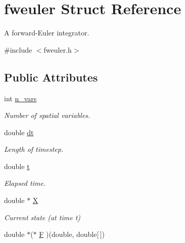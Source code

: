 \hypertarget{structfweuler}{\section{fweuler Struct Reference}
\label{structfweuler}
}


A forward-\/\-Euler integrator.  




{\ttfamily \#include $<$fweuler.\-h$>$}

\subsection*{Public Attributes}
\begin{DoxyCompactItemize}
\item 
\hypertarget{structfweuler_a79f8c4cfdb9adfa253c8b4c037c237f8}{int \hyperlink{structfweuler_a79f8c4cfdb9adfa253c8b4c037c237f8}{n\-\_\-vars}}\label{structfweuler_a79f8c4cfdb9adfa253c8b4c037c237f8}

\begin{DoxyCompactList}\small\item\em Number of spatial variables. \end{DoxyCompactList}\item 
\hypertarget{structfweuler_aaaa8f46ce07dde8c2f1d3fbb0097d166}{double \hyperlink{structfweuler_aaaa8f46ce07dde8c2f1d3fbb0097d166}{dt}}\label{structfweuler_aaaa8f46ce07dde8c2f1d3fbb0097d166}

\begin{DoxyCompactList}\small\item\em Length of timestep. \end{DoxyCompactList}\item 
\hypertarget{structfweuler_ab00dd0addf40e99c6abe9e65f5e140d5}{double \hyperlink{structfweuler_ab00dd0addf40e99c6abe9e65f5e140d5}{t}}\label{structfweuler_ab00dd0addf40e99c6abe9e65f5e140d5}

\begin{DoxyCompactList}\small\item\em Elapsed time. \end{DoxyCompactList}\item 
\hypertarget{structfweuler_ae6a7a8f3084e4a42a4c7da4c4a36dcc0}{double $\ast$ \hyperlink{structfweuler_ae6a7a8f3084e4a42a4c7da4c4a36dcc0}{X}}\label{structfweuler_ae6a7a8f3084e4a42a4c7da4c4a36dcc0}

\begin{DoxyCompactList}\small\item\em Current state (at time t) \end{DoxyCompactList}\item 
\hypertarget{structfweuler_a2010a1b8fcd7024ea0ec02e432df11cb}{double $\ast$($\ast$ \hyperlink{structfweuler_a2010a1b8fcd7024ea0ec02e432df11cb}{F} )(double, double\mbox{[}$\,$\mbox{]})}\label{structfweuler_a2010a1b8fcd7024ea0ec02e432df11cb}


\end{DoxyCompactItemize}
